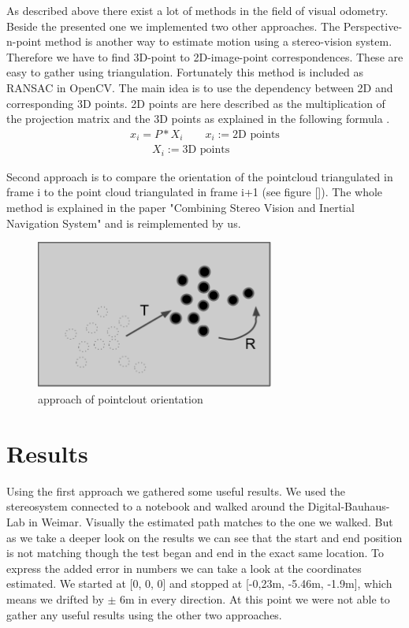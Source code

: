 \documentclass[11pt]{article}
\begin{document}
	As described above there exist a lot of methods in the field of visual odometry. Beside the presented one we implemented two other approaches.
	The Perspective-n-point method is another way to estimate motion using a stereo-vision system. Therefore we have to find 3D-point to 2D-image-point correspondences. These are easy to gather using triangulation. Fortunately this method is included as RANSAC in OpenCV. The main idea is to use the dependency between 2D and corresponding 3D points. 2D points are here described as the multiplication of the projection matrix and the 3D points as explained in the following formula \cite{PnP}.
	\begin{align}
	  x_i = P * X_i \qquad x_i := \text{2D points} \\
	  \qquad X_i := \text{3D points} \nonumber
	\end{align}
	
	Second approach is to compare the orientation of the pointcloud triangulated in frame i to the point cloud triangulated in frame i+1 (see figure []).
	The whole method is explained in the paper "Combining Stereo Vision and Inertial Navigation System" \cite{cloudOrientation} and is reimplemented by us.

	\begin{figure}[H]
		\centering
		\includegraphics[width=0.7\textwidth]{images/pointcloud_orientation.png}
		\caption{approach of pointclout orientation}
	\end{figure}
	
	\section{Results}
	Using the first approach we gathered some useful results. We used the stereosystem connected to a notebook and walked around the Digital-Bauhaus-Lab in Weimar. Visually the estimated path matches to the one we walked. But as we take a deeper look on the results we can see that the start and end position is not matching though the test began and end in the exact same location. To express the added error in numbers we can take a look at the coordinates estimated. We started at [0, 0, 0] and stopped at [-0,23m, -5.46m, -1.9m], which means we drifted by $\pm$ 6m in every direction. At this point we were not able to gather any useful results using the other two approaches.
	
\end{document}
